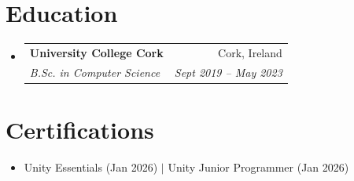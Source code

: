 \documentclass[letterpaper,9pt]{article}
\makeatletter
\newcommand{\resumeItem}[1]{\item\small{#1}}
\newcommand{\resumeSubheading}[4]{
\vspace{-1pt}\item
  \begin{tabular*}{0.97\textwidth}[t]{l@{\extracolsep{\fill}}r}
    \textbf{#1} & #2 \\
    \textit{#3} & \textit{#4} \\
  \end{tabular*}\vspace{-7pt}
}
\newcommand{\resumeSubHeadingList}{\begin{itemize}[leftmargin=0.15in, label={}]}
\newcommand{\resumeSubHeadingListEnd}{\end{itemize}}
\makeatother
\begin{document}
\section{Education}
\resumeSubHeadingList
  \resumeSubheading
      {University College Cork}{Cork, Ireland}
      {B.Sc. in Computer Science}{Sept 2019 -- May 2023}
\resumeSubHeadingListEnd

\section{Certifications}
\resumeSubHeadingList
  \resumeItem{Unity Essentials (Jan 2026) $|$ Unity Junior Programmer (Jan 2026)}
\resumeSubHeadingListEnd
\end{document}
